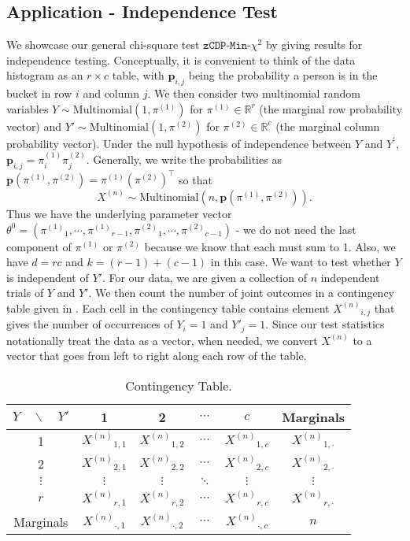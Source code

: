 \documentclass[twoside,letterpaper]{article} \usepackage{aistats2017}
\theoremstyle{definition}
\theoremstyle{remark}
\begin{document}
\subsection{Application - Independence Test \label{sect:IND}}
We showcase our general chi-square test ${\texttt{zCDP-Min-$\chi^2$}}$ by giving results for independence testing. Conceptually, it is convenient to think of the data histogram as an $r\times c$ table, with ${\mathbf{p}}_{i,j}$ being the probability a person is in the bucket in row $i$ and column $j$. We then consider two multinomial random variables $Y \sim {\mathrm{Multinomial}}(1,{\pi^{({1})}})$ for ${\pi^{({1})}} \in {\mathbb{R}}^{r}$ (the marginal row probability vector) and $Y' \sim {\mathrm{Multinomial}}(1,\pi^{(2)})$ for ${\pi^{({2})}} \in {\mathbb{R}}^{c}$  (the marginal column probability vector). Under the null hypothesis of independence between $Y$ and $Y^\prime$, ${\mathbf{p}}_{i,j}=\pi^{(1)}_i\pi^{(2)}_j$. 
Generally, we write the probabilities as ${\mathbf{p}}(\pi^{(1)}, \pi^{(2)}) = {\pi^{({1})}} \left({\pi^{({2})}}\right)^\intercal $ so that 
$$
X^{(n)} \sim {\mathrm{Multinomial}}\left(n,{\mathbf{p}}(\pi^{(1)}, \pi^{(2)})\right).
$$
Thus we have the underlying parameter vector ${\theta^0} = \left({\pi^{({1})}}_{1},\cdots,{\pi^{({1})}}_{r-1}, {\pi^{({2})}}_{1}, \cdots,{\pi^{({2})}}_{c-1} \right)$ - we do not need the last component of ${\pi^{({1})}}$ or ${\pi^{({2})}}$ because we know that each must sum to 1.  Also, we have $d = r c$ and $k = (r-1)+(c-1)$ in this case.  We want to test whether $Y$ is independent of $Y'$.  For our data, we are given a collection of $n$ independent trials of $Y$ and $Y'$.  We then count the number of joint outcomes in a contingency table given in .  Each cell in the contingency table contains element ${X^{({n})}}_{i,j}$ that gives the number of occurrences of $Y_i = 1$ and $Y'_j =1$. 
Since our test statistics notationally treat the data as a vector, when needed, we convert ${X^{({n})}}$ 
to a vector that goes from left to right along each row of the table. 

\begin{table}[ht]
\caption{Contingency Table.} 
\centering 
\begin{tabular}{ c | c | c |c | c | c}
\hline
$Y \quad \backslash \quad Y'$ & 1 & 2 & $\cdots$ & $c$ & Marginals \\
\hline
1 & ${X^{({n})}}_{1,1}$ & ${X^{({n})}}_{1,2}$ & $\cdots$ & ${X^{({n})}}_{1,c}$ & ${X^{({n})}}_{1,\cdot}$ \\
\hline
2 &${X^{({n})}}_{2,1}$ &${X^{({n})}}_{2,2}$ & $\cdots$ & ${X^{({n})}}_{2,c}$ & ${X^{({n})}}_{2,\cdot}$ \\
\hline
$\vdots$ &$\vdots$ & $\vdots$& $\ddots$& $\vdots$ & $\vdots$ \\
\hline
$r$ &${X^{({n})}}_{r,1}$ &${X^{({n})}}_{r,2}$ &$\cdots$ &${X^{({n})}}_{r,c}$ & ${X^{({n})}}_{r,\cdot}$ \\
\hline
Marginals & ${X^{({n})}}_{\cdot, 1}$&${X^{({n})}}_{\cdot, 2}$ & $\cdots$ & ${X^{({n})}}_{\cdot, c}$& $n$
\end{tabular}
\label{table:contingency}
\end{table}
\end{document}
